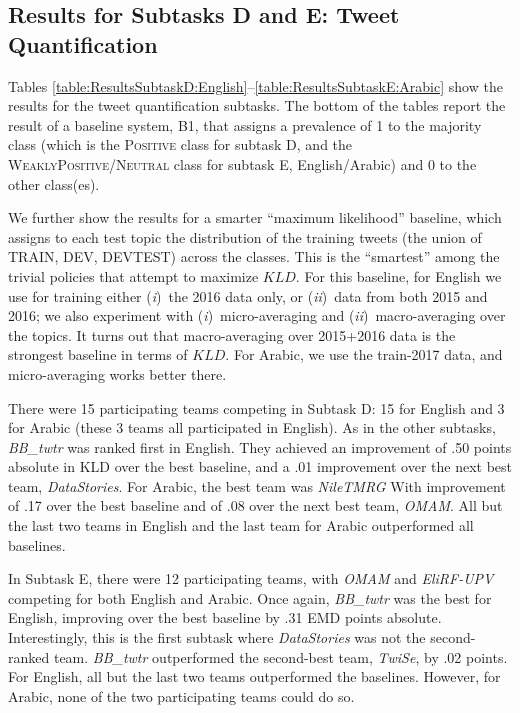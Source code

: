 \documentclass[11pt,a4paper]{article}
\begin{document}
\subsection{Results for Subtasks D and E: Tweet Quantification}

Tables \ref{table:ResultsSubtaskD:English}--\ref{table:ResultsSubtaskE:Arabic} show the results for the tweet quantification subtasks.
The bottom of the tables report the result of a baseline system, B1, that assigns a prevalence of 1 to the majority class (which is the \textsc{Positive} class for subtask D, and the \textsc{WeaklyPositive}/\textsc{Neutral} class for subtask E, English/Arabic) and 0 to the other class(es). 

We further show the results for a smarter ``maximum likelihood'' baseline, which assigns to each test topic the distribution of the training tweets (the union of TRAIN, DEV, DEVTEST) across the classes. This is the ``smartest'' among the trivial policies that attempt to maximize $KLD$. 
For this baseline, for English we use for training either (\emph{i})~the 2016 data only, or (\emph{ii})~data from both 2015 and 2016; we also experiment with (\emph{i})~micro-averaging and (\emph{ii})~macro-averaging over the topics. It turns out that macro-averaging over 2015+2016 data is the strongest baseline in terms of $KLD$. For Arabic, we use the train-2017 data, and micro-averaging works better there.

\noindent There were 15 participating teams competing in Subtask D: 15 for English and 3 for Arabic (these 3 teams all participated in English). As in the other subtasks, \emph{BB\_twtr} was ranked first in English. They 
achieved an improvement of .50 points absolute in KLD over the best baseline, and a .01 improvement over the next best team, \emph{DataStories}. 
For Arabic, the best team was \emph{NileTMRG}
With improvement of .17 over the best baseline and of .08 over the next best team, \emph{OMAM}. All but the last two teams in English and the last team for Arabic outperformed all baselines.

In Subtask E, there were 12 participating teams, with \emph{OMAM} and \emph{EliRF-UPV} competing for both English and Arabic. Once again, \emph{BB\_twtr} was the best for English, improving over the best baseline by .31 EMD points absolute.
Interestingly, this is the first subtask where \emph{DataStories} was not the second-ranked team.
\emph{BB\_twtr} outperformed the second-best team, \emph{TwiSe}, by .02 points. For English, all but the last two teams outperformed the baselines. However, for Arabic, none of the two participating teams could do so. 
\end{document}
